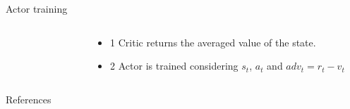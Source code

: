 \documentclass[10pt]{beamer}
\begin{document}
\begin{frame}{Actor training}
\begin{columns}[c]
\begin{column}{0.5\textwidth}
\begin{figure}
\begin{tikzpicture}[x=0.75pt,y=0.75pt,yscale=-1,xscale=1]
\end{tikzpicture}

		\end{figure}
		\end{column}
		\begin{column}{0.5\textwidth}
			\centering
			\begin{itemize}
				\item\alert{1} Critic returns the averaged value of the state.
				\item\alert{2} Actor is trained considering $s_t$, $a_t$ and $adv_t =r_t-v_t$ 
			\end{itemize}
		\end{column}
		
	\end{columns}

\end{frame}


\begin{frame}[allowframebreaks]{References}

  
  

\end{frame}
\end{document}
